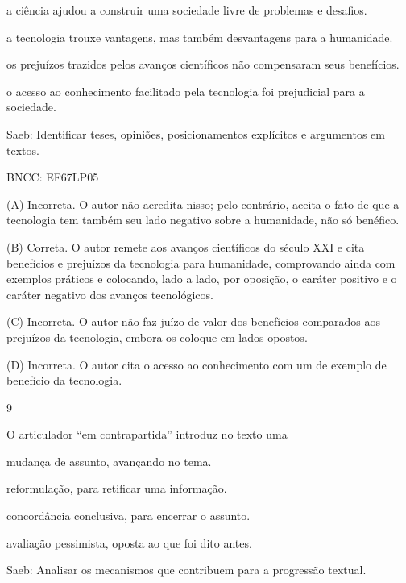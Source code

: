 \begin{escolha}
\item a ciência ajudou a construir uma sociedade livre de problemas e
desafios.

\item a tecnologia trouxe vantagens, mas também desvantagens para a
humanidade.

\item os prejuízos trazidos pelos avanços científicos não compensaram seus
benefícios.

\item o acesso ao conhecimento facilitado pela tecnologia foi prejudicial
para a sociedade.
\end{escolha}

Saeb: Identificar teses, opiniões, posicionamentos explícitos e
argumentos em textos.

BNCC: EF67LP05

(A) Incorreta. O autor não acredita nisso; pelo contrário, aceita o fato
de que a tecnologia tem também seu lado negativo sobre a humanidade, não
só benéfico.

(B) Correta. O autor remete aos avanços científicos do século XXI e cita
benefícios e prejuízos da tecnologia para humanidade, comprovando ainda
com exemplos práticos e colocando, lado a lado, por oposição, o caráter
positivo e o caráter negativo dos avanços tecnológicos.

(C) Incorreta. O autor não faz juízo de valor dos benefícios comparados
aos prejuízos da tecnologia, embora os coloque em lados opostos.

(D) Incorreta. O autor cita o acesso ao conhecimento com um de exemplo
de benefício da tecnologia.

\num{9}

O articulador ``em contrapartida'' introduz no texto uma

\begin{escolha}
\item mudança de assunto, avançando no tema.

\item reformulação, para retificar uma informação.

\item concordância conclusiva, para encerrar o assunto.

\item avaliação pessimista, oposta ao que foi dito antes.
\end{escolha}

Saeb: Analisar os mecanismos que contribuem para a progressão textual.

